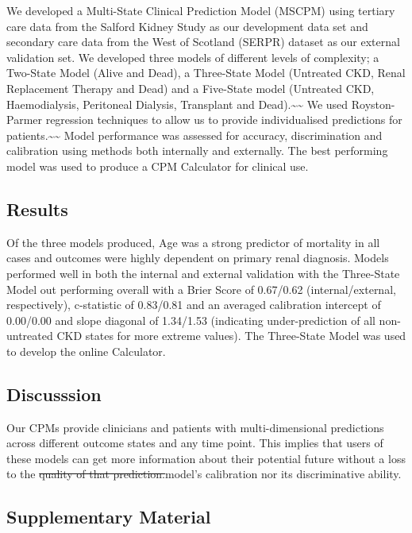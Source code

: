 \documentclass[12pt,PhD,twoside,openright]{muthesis}
\begin{document}
We developed a Multi-State Clinical Prediction Model (MSCPM) using tertiary care data from the Salford Kidney Study as our development data set and secondary care data from the West of Scotland (SERPR) dataset as our external validation set. We developed three models of different levels of complexity; a Two-State Model (Alive and Dead), a Three-State Model (Untreated CKD, Renal Replacement Therapy and Dead) and a Five-State model (Untreated CKD, Haemodialysis, Peritoneal Dialysis, Transplant and Dead).\textasciitilde\textasciitilde{} We used Royston-Parmer regression techniques to allow us to provide individualised predictions for patients.\textasciitilde\textasciitilde{} Model performance was assessed for accuracy, discrimination and calibration using methods both internally and externally. The best performing model was used to produce a CPM Calculator for clinical use.

\hypertarget{results-4}{%
\subsection*{Results}\label{results-4}}

Of the three models produced, Age was a strong predictor of mortality in all cases and outcomes were highly dependent on primary renal diagnosis. Models performed well in both the internal and external validation with the Three-State Model out performing overall with a Brier Score of 0.67/0.62 (internal/external, respectively), c-statistic of 0.83/0.81 and an averaged calibration intercept of 0.00/0.00 and slope diagonal of 1.34/1.53 (indicating under-prediction of all non-untreated CKD states for more extreme values). The Three-State Model was used to develop the online Calculator.

\hypertarget{discusssion}{%
\subsection*{Discusssion}\label{discusssion}}

Our CPMs provide clinicians and patients with multi-dimensional predictions across different outcome states and any time point. This implies that users of these models can get more information about their potential future without a loss to the \sout{quality of that prediction.}model's calibration nor its discriminative ability.

\hypertarget{supplementary-material-2}{%
\subsection*{Supplementary Material}\label{supplementary-material-2}}
\end{document}
